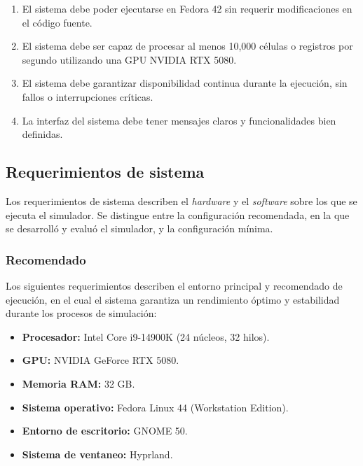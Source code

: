 \begin{enumerate}[label=RNF\arabic*., noitemsep]
	
	\item El sistema debe poder ejecutarse en Fedora 42 sin requerir modificaciones en el código fuente.
	
	\item El sistema debe ser capaz de procesar al menos 10,000 células o registros por segundo utilizando una GPU NVIDIA RTX 5080.
	
	\item El sistema debe garantizar disponibilidad continua durante la ejecución, sin fallos o interrupciones críticas.
	
	\item La interfaz del sistema debe tener mensajes claros y funcionalidades bien definidas.
	
\end{enumerate}

\subsection{Requerimientos de sistema}

Los requerimientos de sistema describen el \textit{hardware} y el \textit{software} sobre los que se ejecuta el simulador. Se distingue entre la configuración recomendada, en la que se desarrolló y evaluó el simulador, y la configuración mínima.

\subsubsection{Recomendado}

Los siguientes requerimientos describen el entorno principal y recomendado de ejecución, en el cual el sistema garantiza un rendimiento óptimo y estabilidad durante los procesos de simulación:

\begin{itemize}
	
	\item \textbf{Procesador:} Intel Core i9-14900K (24 núcleos, 32 hilos).
	
	\item \textbf{GPU:} NVIDIA GeForce RTX 5080.
	
	\item \textbf{Memoria RAM:} 32 GB.
	
	\item \textbf{Sistema operativo:} Fedora Linux 44 (Workstation Edition).
	
	\item \textbf{Entorno de escritorio:} GNOME 50.
	
	\item \textbf{Sistema de ventaneo:} Hyprland.
	
\end{itemize}

